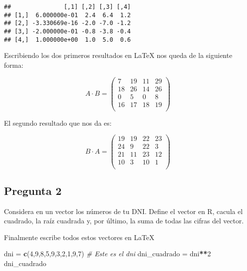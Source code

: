 \documentclass[
]{article}
\newenvironment{Shaded}{\begin{snugshade}}{\end{snugshade}}
\newcommand{\CommentTok}[1]{\textcolor[rgb]{0.56,0.35,0.01}{\textit{#1}}}
\newcommand{\DecValTok}[1]{\textcolor[rgb]{0.00,0.00,0.81}{#1}}
\newcommand{\KeywordTok}[1]{\textcolor[rgb]{0.13,0.29,0.53}{\textbf{#1}}}
\newcommand{\NormalTok}[1]{#1}
\newcommand{\OperatorTok}[1]{\textcolor[rgb]{0.81,0.36,0.00}{\textbf{#1}}}
\newcommand{\StringTok}[1]{\textcolor[rgb]{0.31,0.60,0.02}{#1}}
\begin{document}
\begin{verbatim}
##               [,1] [,2] [,3] [,4]
## [1,]  6.000000e-01  2.4  6.4  1.2
## [2,] -3.330669e-16 -2.0 -7.0 -1.2
## [3,] -2.000000e-01 -0.8 -3.8 -0.4
## [4,]  1.000000e+00  1.0  5.0  0.6
\end{verbatim}

Escribiendo los dos primeros resultados en \LaTeX{} nos queda de la
siguiente forma:

\[
  A\cdot B = 
  \begin{pmatrix}
  7 &  19 &  11 &  29 \\
  18  & 26  & 14  & 26\\
  0   & 5 &   0 &   8\\
  16  & 17  & 18  & 19\\
  \end{pmatrix}
\]

El segundo resultado que nos da es:

\[
  B \cdot A =
  \begin{pmatrix}
    19 &  19  & 22  & 23\\
    24  &  9  & 22  &  3\\
    21  & 11  & 23  & 12\\
    10  &  3 &  10  &  1\\
  \end{pmatrix}
\]

\hypertarget{pregunta-2}{%
\subsection{Pregunta 2}\label{pregunta-2}}

Considera en un vector los números de tu DNI. Define el vector en R,
cacula el cuadrado, la raíz cuadrada y, por último, la suma de todas las
cifras del vector.

Finalmente escribe todos estos vectores en LaTeX

\begin{Shaded}
\begin{Highlighting}[]
\NormalTok{dni =}\StringTok{ }\KeywordTok{c}\NormalTok{(}\DecValTok{4}\NormalTok{,}\DecValTok{9}\NormalTok{,}\DecValTok{8}\NormalTok{,}\DecValTok{5}\NormalTok{,}\DecValTok{9}\NormalTok{,}\DecValTok{3}\NormalTok{,}\DecValTok{2}\NormalTok{,}\DecValTok{1}\NormalTok{,}\DecValTok{9}\NormalTok{,}\DecValTok{7}\NormalTok{) }\CommentTok{# Este es el dni}
\NormalTok{dni_cuadrado =}\StringTok{ }\NormalTok{dni}\OperatorTok{**}\DecValTok{2}
\NormalTok{dni_cuadrado}
\end{Highlighting}
\end{Shaded}
\end{document}
